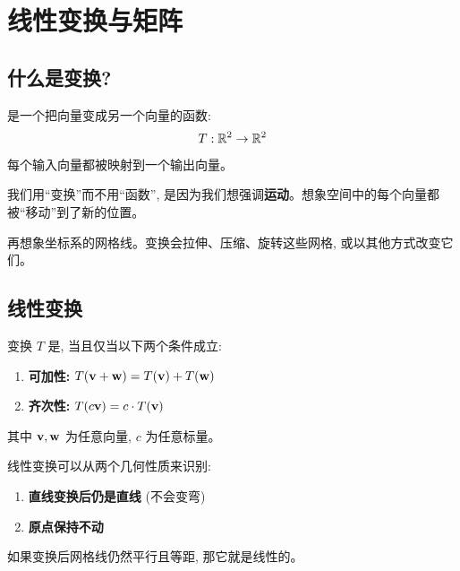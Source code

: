 
\chapter{线性变换与矩阵}
\label{ch:transformations}

\begin{abstract}
线性变换 (linear transformation) 是线性代数的核心。在本章中, 我们将学习任何线性变换都可以用一个矩阵 (matrix) 来表示, 以及矩阵乘法与变换复合之间的关系。
\end{abstract}

\section{什么是变换?}

\begin{definition}[变换 (transformation)]
是一个把向量变成另一个向量的函数:
\[
T: \mathbb{R}^2 \to \mathbb{R}^2
\]
每个输入向量都被映射到一个输出向量。
\end{definition}

\begin{intuition}
我们用``变换''而不用``函数'', 是因为我们想强调\textbf{运动}。想象空间中的每个向量都被``移动''到了新的位置。

再想象坐标系的网格线。变换会拉伸、压缩、旋转这些网格, 或以其他方式改变它们。
\end{intuition}

\section{线性变换}

\begin{definition}
变换 $T$ 是, 当且仅当以下两个条件成立:
\begin{enumerate}
    \item \textbf{可加性:} $T(\mathbf{v} + \mathbf{w}) = T(\mathbf{v}) + T(\mathbf{w})$
    \item \textbf{齐次性:} $T(c\mathbf{v}) = c \cdot T(\mathbf{v})$
\end{enumerate}
其中 $\mathbf{v}, \mathbf{w}$ 为任意向量, $c$ 为任意标量。
\end{definition}

\begin{intuition}
线性变换可以从两个几何性质来识别:
\begin{enumerate}
    \item \textbf{直线变换后仍是直线} (不会变弯)
    \item \textbf{原点保持不动}
\end{enumerate}

如果变换后网格线仍然平行且等距, 那它就是线性的。
\end{intuition}

